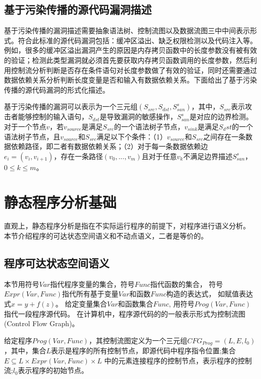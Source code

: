 \subsection{基于污染传播的源代码漏洞描述}

基于污染传播的漏洞描述需要抽象语法树、控制流图以及数据流图三中中间表示形式。符合此标准的源代码漏洞包括：缓冲区溢出、缺乏权限检测以及代码注入等。例如，很多的缓冲区溢出漏洞产生的原因是内存拷贝函数中的长度参数没有被有效的验证；检测此类型漏洞就必须首先要获取内存拷贝函数调用的长度参数，然后利用控制流分析判断是否存在条件语句对长度参数做了有效的验证，同时还需要通过数据依赖关系分析判断长度变量是否和输入有数据依赖关系。下面给出了基于污染传播的源代码漏洞的形式化描述。

\begin{definition}
\label{基于污染传播的源代码漏洞描述}
基于污染传播的漏洞可以表示为一个三元组$(S_{src},S_{dst},S^{s}_{san})$，其中，$S_{src}$表示攻击者能够控制的输入语句，$S_{dst}$是导致漏洞的敏感操作，$S^{s}_{san}$是对应的边界检测。对于一个节点$v$，若$v_{source}$是满足$S_{src}$的一个语法树子节点，$v_{sink}$是满足$S_dst$的一个语法树子节点，且$v_{source}$和$S_{src}$满足以下个条件：（1）$v_{source}$和$S_{src}$之间存在一条数据依赖路径，即二者有数据依赖关系；（2）对于每一条数据依赖边$e_i = (v_i, v_{i+1})$，存在一条路径$(v_0,...,v_m)$且对于任意$v_k$不满足边界描述$S^{s}_{san}$，$0 \leq k \leq m$。
\end{definition}

\section{静态程序分析基础}

直观上，静态程序分析是指在不实际运行程序的前提下，对程序进行语义分析。
本节介绍程序的可达状态空间语义和不动点语义，二者是等价的。

\subsection{程序可达状态空间语义}

本节用符号$Var$指代程序变量的集合，符号$Func$指代函数的集合，
符号$Expr(Var, Func)$指代所有基于变量$Var$和函数$Func$构造的表达式，
如赋值表达式$x = y + f(z)$。
给定变量集合$Var$和函数集合$Func$, 用符号$Prog(Var, Func)$指代一段程序源代码。
在计算机中，程序源代码的的一般表示形式为控制流图(Control Flow Graph)。

\begin{definition}
给定程序$Prog(Var, Func)$，其控制流图定义为一个三元组$CFG_{Prog} = (L, E, l_0)$，其中，集合$L$表示是程序的所有控制节点，即源代码中程序指令位置;集合$E\subseteq L\times Expr(Var, Func) \times L$
	中的元素连接程序的控制节点，表示程序的控制流;$l_0$表示程序的初始节点。
\end{definition}


